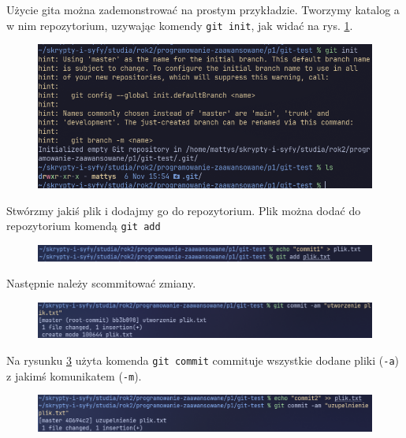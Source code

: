 Użycie gita można zademonstrować na prostym przykładzie. Tworzymy katalog a w nim repozytorium, uzywając komendy \texttt{git init}, jak widać na rys. \ref{fig:git_init}.

\begin{figure}[H]
	\centering
	\includegraphics[width=1\textwidth]{images/git_init.png}
	\caption{}
	\label{fig:git_init}
\end{figure}

Stwórzmy jakiś plik i dodajmy go do repozytorium. Plik można dodać do repozytorium komendą \texttt{git add}

\begin{figure}[H]
	\centering
	\includegraphics[width=1\textwidth]{images/git_add.png}
	\caption{}
	\label{fig:git_add}
\end{figure}

Następnie należy scommitować zmiany. 

\begin{figure}[H]
	\centering
	\includegraphics[width=1\textwidth]{images/git_commit1.png}
	\caption{}
	\label{fig:git_commit1}
\end{figure}

Na rysunku \ref{fig:git_commit1} użyta komenda \texttt{git commit} commituje wszystkie dodane pliki (\texttt{-a}) z jakimś komunikatem (\texttt{-m}).  

\begin{figure}[H]
	\centering
	\includegraphics[width=1\textwidth]{images/git_commit2.png}
	\caption{}
	\label{fig:git_commit2}
\end{figure}

